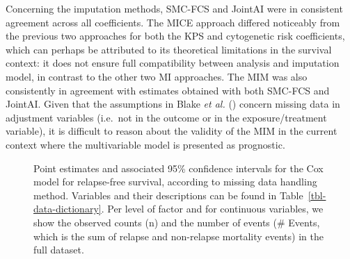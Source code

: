 \documentclass[
  letterpaper,
  paper=240mm:170mm,
  twoside=true,
  open=right,
  fontsize=10pt,
  pagesize=false,
  BCOR=15mm,
  DIV=14,
  headinclude=true,
  footinclude=false,
  headsepline=on]{scrbook}
\begin{document}
Concerning the imputation methods, SMC-FCS and JointAI were in
consistent agreement across all coefficients. The MICE approach differed
noticeably from the previous two approaches for both the KPS and
cytogenetic risk coefficients, which can perhaps be attributed to its
theoretical limitations in the survival context: it does not ensure full
compatibility between analysis and imputation model, in contrast to the
other two MI approaches. The MIM was also consistently in agreement with
estimates obtained with both SMC-FCS and JointAI. Given that the
assumptions in Blake \emph{et al.}
() concern
missing data in adjustment variables (i.e.~not in the outcome or in the
exposure/treatment variable), it is difficult to reason about the
validity of the MIM in the current context where the multivariable model
is presented as prognostic.

\begin{figure}


\caption{\label{fig-forest-efs}Point estimates and associated 95\%
confidence intervals for the Cox model for relapse-free survival,
according to missing data handling method. Variables and their
descriptions can be found in Table~\ref{tbl-data-dictionary}. Per level
of factor and for continuous variables, we show the observed counts (n)
and the number of events (\# Events, which is the sum of relapse and
non-relapse mortality events) in the full dataset.}

\end{figure}%
\end{document}
